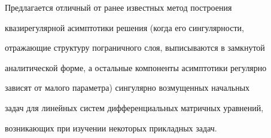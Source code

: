 \pagestyle{plain} %


 




\maketitle 


\label{begin} 


 


 


 


 


Предлагается отличный от ранее известных метод построения 


квазирегулярной асимптотики решения (когда его сингулярности, 


отражающие структуру пограничного слоя, выписываются в замкнутой 


аналитической форме, а остальные компоненты асимптотики регулярно 


зависят от малого параметра) сингулярно возмущенных начальных 


задач для линейных систем дифференциальных матричных уравнений, 


возникающих при изучении некоторых прикладных задач. 


 


 


